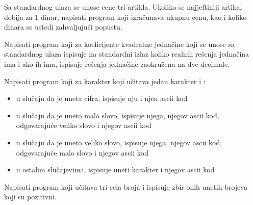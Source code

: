 \begin{Exercise}[label=v1.2_06] 
Sa standardnog ulaza se unose cene tri artikla. Ukoliko se najjeftiniji
  artikal dobija za 1 dinar, napisati program koji izračunava ukupnu cenu, kao i koliko
  dinara se ustedi zahvaljujući popustu.  
\end{Exercise}
\begin{Answer}[ref=v1.2_06]
\end{Answer}

\begin{Exercise}[label=v1.2_07] 
Napisati program koji za koeficijente kvadratne jednačine
koji se unose sa standardnog ulaza 
ispisuje na standardni izlaz koliko realnih rešenja jednačina ima i ako ih ima, ispisuje rešenja jednačine
zaokružena na dve decimale.
\end{Exercise}
\begin{Answer}[ref=v1.2_07]
\end{Answer}

\begin{Exercise}[label=v1.2_08] 
Napisati program koji za karakter koji učitava jedan karakter i :
\begin{itemize}
\item{u slučaju da je uneta cifra, ispisuje nju i njen ascii kod} 
\item{u slučaju da je uneto malo slovo, ispisuje njega, njegov ascii kod, odgovarajuće veliko slovo i njegov ascii kod}
\item{u slučaju da je uneto veliko slovo, ispisuje njega, njegov ascii kod, odgovarajuće malo slovo i njegov ascii kod}
\item{u ostalim slučajevima, ispisuje uneti karakter i njegov ascii kod} 
\end{itemize}
\end{Exercise}
\begin{Answer}[ref=v1.2_08]
\end{Answer}

\begin{Exercise}[label=v1.2_09] 
Napisati program koji učitava tri cela broja i ispisuje zbir onih unetih brojeva
koji su pozitivni.
\end{Exercise}
\begin{Answer}[ref=v1.2_09]
\end{Answer}

